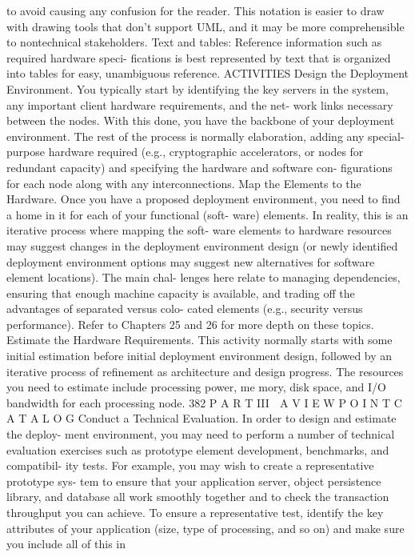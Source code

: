 to avoid causing any confusion for the reader. This notation is easier to
draw with drawing tools that don’t support UML, and it may be more
comprehensible to nontechnical stakeholders.
Text and tables: Reference information such as required hardware speci-
fications is best represented by text that is organized into tables for easy,
unambiguous reference.
ACTIVITIES
Design the Deployment Environment. You typically start by identifying the key
servers in the system, any important client hardware requirements, and the net-
work links necessary between the nodes. With this done, you have the backbone
of your deployment environment. The rest of the process is normally elaboration,
adding any special-purpose hardware required (e.g., cryptographic accelerators,
or nodes for redundant capacity) and specifying the hardware and software con-
figurations for each node along with any interconnections.
Map the Elements to the Hardware. Once you have a proposed deployment
environment, you need to find a home in it for each of your functional (soft-
ware) elements. In reality, this is an iterative process where mapping the soft-
ware elements to hardware resources may suggest changes in the deployment
environment design (or newly identified deployment environment options
may suggest new alternatives for software element locations). The main chal-
lenges here relate to managing dependencies, ensuring that enough machine
capacity is available, and trading off the advantages of separated versus colo-
cated elements (e.g., security versus performance). Refer to Chapters 25 and
26 for more depth on these topics.
Estimate the Hardware Requirements. This activity normally starts with
some initial estimation before initial deployment environment design, followed
by an iterative process of refinement as architecture and design progress. The
resources you need to estimate include processing power, me mory, disk space,
and I/O bandwidth for each processing node.
382
 P A R T III  A V I E W P O I N T C A T A L O G
Conduct a Technical Evaluation. In order to design and estimate the deploy-
ment environment, you may need to perform a number of technical evaluation
exercises such as prototype element development, benchmarks, and compatibil-
ity tests. For example, you may wish to create a representative prototype sys-
tem to ensure that your application server, object persistence library, and
database all work smoothly together and to check the transaction throughput
you can achieve.
To ensure a representative test, identify the key attributes of your application
(size, type of processing, and so on) and make sure you include all of this in
